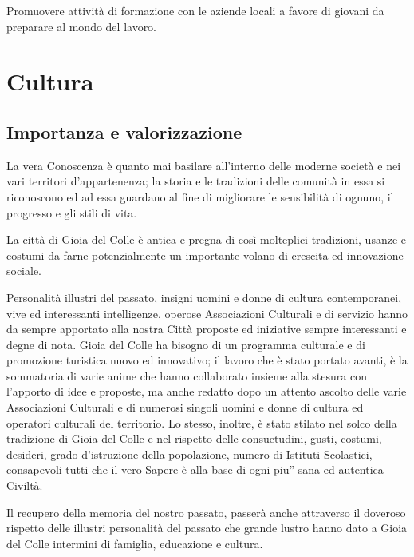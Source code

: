 \documentclass[a4paper,14pt,italian]{sphinxmanual}
\begin{document}
Promuovere attività di formazione con le aziende locali a favore di giovani da preparare al mondo del lavoro.


\chapter{Cultura}
\label{\detokenize{cultura:cultura}}\label{\detokenize{cultura::doc}}

\section{Importanza e valorizzazione}
\label{\detokenize{cultura:importanza-e-valorizzazione}}
La vera Conoscenza è quanto mai basilare all’interno delle moderne società e nei vari territori d’appartenenza; la storia e le tradizioni delle comunità in essa si riconoscono ed ad essa guardano al fine di migliorare le sensibilità di ognuno, il progresso e gli stili di vita.

La città di Gioia del Colle è antica e pregna di così molteplici tradizioni, usanze e costumi da farne potenzialmente un importante volano di crescita ed innovazione sociale.

Personalità illustri del passato, insigni uomini e donne di cultura contemporanei, vive ed interessanti intelligenze, operose Associazioni Culturali e di servizio hanno da sempre apportato alla nostra Città proposte ed iniziative sempre interessanti e degne di nota.
Gioia del Colle ha bisogno di un programma culturale e di promozione turistica nuovo ed innovativo; il lavoro che è stato portato avanti, è la sommatoria di varie anime che hanno collaborato insieme alla stesura con l’apporto di idee e proposte, ma anche redatto dopo un attento ascolto delle varie Associazioni Culturali e di numerosi singoli uomini e donne di cultura ed operatori culturali del territorio. Lo stesso, inoltre, è stato stilato nel solco della tradizione di Gioia del Colle e nel rispetto delle consuetudini, gusti, costumi, desideri, grado d’istruzione della popolazione, numero di Istituti Scolastici, consapevoli tutti che il vero Sapere è alla base di ogni piu” sana ed autentica Civiltà.

Il recupero della memoria del nostro passato, passerà anche attraverso il doveroso rispetto delle illustri personalità del passato che grande lustro hanno dato a Gioia del Colle intermini di famiglia, educazione e cultura.
\end{document}
